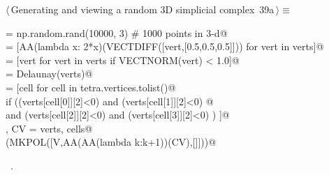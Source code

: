 \documentclass[11pt,oneside]{article}	%
\begin{document}
\begin{flushleft} \small \label{scrap76}
\protect{}$\langle\,$Generating and viewing a random 3D simplicial complex\nobreak\ {\footnotesize 39a}$\,\rangle\equiv$
\vspace{-1ex}
\begin{list}{}{} \item
\mbox{}\verb@verts = np.random.rand(10000, 3) # 1000 points in 3-d@\\
\mbox{}\verb@verts = [AA(lambda x: 2*x)(VECTDIFF([vert,[0.5,0.5,0.5]])) for vert in verts]@\\
\mbox{}\verb@verts = [vert for vert in verts if VECTNORM(vert) < 1.0]@\\
\mbox{}\verb@tetra = Delaunay(verts)@\\
\mbox{}\verb@cells = [cell for cell in tetra.vertices.tolist()@\\
\mbox{}\verb@         if  ((verts[cell[0]][2]<0) and (verts[cell[1]][2]<0) @\\
\mbox{}\verb@               and (verts[cell[2]][2]<0) and (verts[cell[3]][2]<0) ) ]@\\
\mbox{}\verb@V, CV = verts, cells@\\
\mbox{}\verb@VIEW(MKPOL([V,AA(AA(lambda k:k+1))(CV),[]]))@\\
\mbox{}\verb@@{\NWsep}
\end{list}
\vspace{-1ex}
\footnotesize\addtolength{\baselineskip}{-1ex}
\begin{list}{}{\setlength{\itemsep}{-\parsep}\setlength{\itemindent}{-\leftmargin}}
\item \NWtxtMacroRefIn\ .
\end{list}
\end{flushleft}
\end{document}
